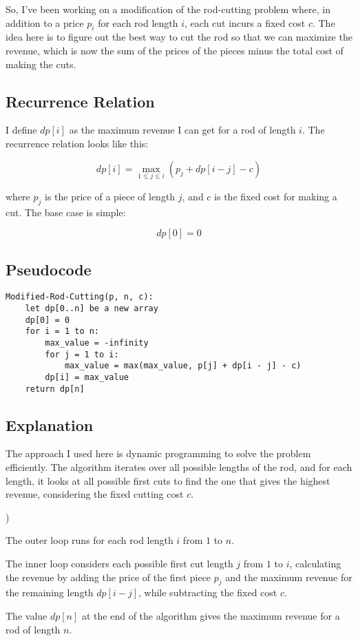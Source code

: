 \documentclass[10pt,letter,notitlepage]{article}
\newcounter{numListCounter}
\newenvironment
{numList}
{\begin{list}
{\arabic{numListCounter})}
{\usecounter{numListCounter}
\setlength{\rightmargin}{0cm}
\setlength{\leftmargin}{0.5cm}
\setlength{\itemsep}{0cm}
\setlength{\partopsep}{0cm}
\setlength{\parsep}{0cm}}
}
{\end{list}}
\begin{document}
\begin{Answer}[]

So, I've been working on a modification of the rod-cutting problem where, in addition to a price $p_i$ for each rod length $i$, each cut incurs a fixed cost $c$. The idea here is to figure out the best way to cut the rod so that we can maximize the revenue, which is now the sum of the prices of the pieces minus the total cost of making the cuts.

\subsection*{Recurrence Relation}
I define $dp[i]$ as the maximum revenue I can get for a rod of length $i$. The recurrence relation looks like this:

\[
dp[i] = \max_{1 \le j \le i} (p_j + dp[i - j] - c)
\]

where $p_j$ is the price of a piece of length $j$, and $c$ is the fixed cost for making a cut. The base case is simple:

\[
dp[0] = 0
\]

\subsection*{Pseudocode}
\begin{verbatim}
Modified-Rod-Cutting(p, n, c):
    let dp[0..n] be a new array
    dp[0] = 0
    for i = 1 to n:
        max_value = -infinity
        for j = 1 to i:
            max_value = max(max_value, p[j] + dp[i - j] - c)
        dp[i] = max_value
    return dp[n]
\end{verbatim}

\subsection*{Explanation}
The approach I used here is dynamic programming to solve the problem efficiently. The algorithm iterates over all possible lengths of the rod, and for each length, it looks at all possible first cuts to find the one that gives the highest revenue, considering the fixed cutting cost $c$.

\begin{numList}
    \item The outer loop runs for each rod length $i$ from $1$ to $n$.
    \item The inner loop considers each possible first cut length $j$ from $1$ to $i$, calculating the revenue by adding the price of the first piece $p_j$ and the maximum revenue for the remaining length $dp[i - j]$, while subtracting the fixed cost $c$.
\end{numList}
The value $dp[n]$ at the end of the algorithm gives the maximum revenue for a rod of length $n$.


\end{Answer}
\end{document}

